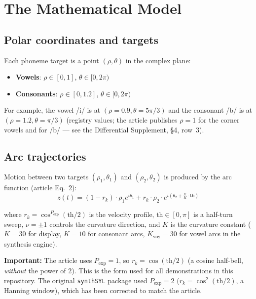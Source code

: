 \documentclass[11pt,a4paper]{article}
\begin{document}
\section{The Mathematical Model}

\subsection{Polar coordinates and targets}

Each phoneme target is a point $(\rho, \theta)$ in the complex
plane:
\begin{itemize}
\item \textbf{Vowels}: $\rho \in [0, 1]$, $\theta \in [0, 2\pi)$
\item \textbf{Consonants}: $\rho \in [0, 1.2]$, $\theta \in [0, 2\pi)$
\end{itemize}

For example, the vowel /i/ is at $(\rho=0.9, \theta=5\pi/3)$ and the
consonant /b/ is at $(\rho=1.2, \theta=\pi/3)$ (registry values; the
article publishes $\rho=1$ for the corner vowels and for /b/ --- see the
Differential Supplement, \S4, row~3).

\subsection{Arc trajectories}

Motion between two targets $(\rho_1, \theta_1)$ and
$(\rho_2, \theta_2)$ is produced by the arc function (article Eq.~2):
\begin{equation}
z(t) = (1 - r_k) \cdot \rho_1 e^{i\theta_1}
     + r_k \cdot \rho_2 \cdot e^{i(\theta_2 + \frac{\nu}{K} \cdot \text{th})}
\label{eq:arc}
\end{equation}

where $r_k = \cos^{P_{\text{exp}}}(\text{th}/2)$ is the velocity profile,
$\text{th} \in [0, \pi]$ is a half-turn sweep, $\nu = \pm 1$
controls the curvature direction, and $K$ is the curvature constant
($K=30$ for display, $K=10$ for consonant arcs, $K_{\text{voy}}=30$
for vowel arcs in the synthesis engine).

\textbf{Important:} The article uses $P_{\text{exp}} = 1$, so
$r_k = \cos(\text{th}/2)$ (a cosine half-bell, \textit{without} the
power of 2). This is the form used for all demonstrations in this
repository. The original \texttt{synthSYL} package used $P_{\text{exp}}
= 2$ ($r_k = \cos^2(\text{th}/2)$, a Hanning window), which has been
corrected to match the article.
\end{document}
